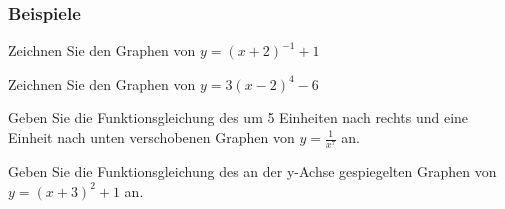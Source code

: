 \subsubsection{Beispiele}
\begin{example}
    Zeichnen Sie den Graphen von $y=(x+2)^{-1} +1$
\end{example}
\begin{example}
    Zeichnen Sie den Graphen von $y=3(x-2)^{4} - 6$
\end{example}
\newpage
\begin{example}
    Geben Sie die Funktionsgleichung des um 5 Einheiten nach rechts und eine Einheit nach unten verschobenen Graphen von $y=\frac{1}{x^7}$ an.
\end{example}

\begin{example}
    Geben Sie die Funktionsgleichung des an der y-Achse gespiegelten Graphen von $y=(x+3)^2+1$ an.
\end{example}
